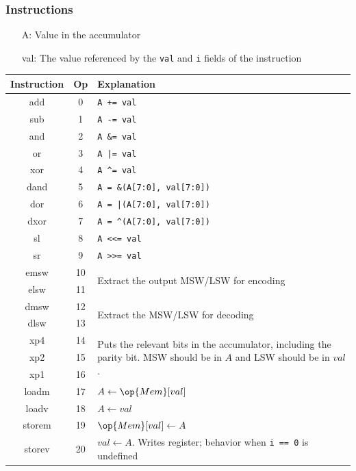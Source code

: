 	\begin{frame}[fragile]
		\frametitle{Instructions}

		\begin{itemize}
			\small
			\item[A:] Value in the accumulator
			\item[val:] The value referenced by the \texttt{val} and \texttt{i} fields of the instruction \\
		\end{itemize}

		\begin{table}[]
			\tiny
			\begin{tabular}{|c|c|l|}
				\hline
				Instruction & Op & Explanation \\ \hline
				add & 0 & \texttt{A += val} \\
				sub & 1 & \texttt{A -= val} \\ \hline
				and & 2 & \texttt{A \&= val} \\
				or & 3 & \texttt{A |= val} \\
				xor & 4 & \verb|A ^= val| \\ \hline
				dand & 5 & \verb|A = &(A[7:0], val[7:0])| \\
				dor & 6 & \verb/A = |(A[7:0], val[7:0]) / \\
				dxor & 7 & \verb|A = ^(A[7:0], val[7:0])| \\ \hline
				sl & 8 & \verb|A <<= val| \\
				sr & 9 & \verb|A >>= val| \\ \hline
				emsw & 10 & \multirow{2}{25em}{Extract the output MSW/LSW for encoding} \\
				elsw & 11 & \\
				dmsw & 12 & \multirow{2}{25em}{Extract the MSW/LSW for decoding} \\
				dlsw & 13 & \\ \hline
				xp4 & 14 & \multirow{3}{25em}{Puts the relevant bits in the accumulator, including the parity bit. MSW should be in $A$ and LSW should be in $val$.} \\
				xp2 & 15 & \\
				xp1 & 16 & \\ \hline
				loadm & 17 & $A \leftarrow \op{Mem}[val]$ \\
				loadv & 18 & $A \leftarrow val$ \\
				storem & 19 & $\op{Mem}[val] \leftarrow A$ \\
				storev & 20 & $val \leftarrow A$. Writes register; behavior when \verb|i == 0| is undefined \\ \hline

\end{tabular}
\end{table}
\end{frame}
